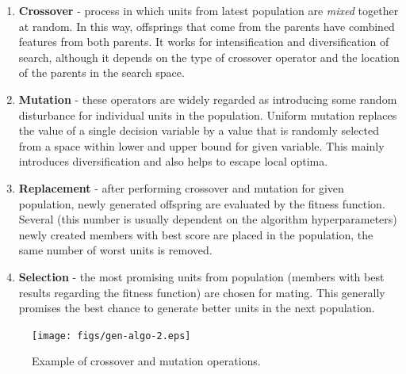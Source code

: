\documentclass[12pt,a4paper,openany]{book}
\begin{document}




\begin{enumerate}
\item \textbf{Crossover} - process in which units from latest population are \textit{mixed} together at random. In this way, offsprings that come from the parents have combined features from both parents. It works for intensification and diversification of search, although it depends on the type of crossover operator and the location of the parents in the search space.
\item \textbf{Mutation} - these operators are widely regarded as introducing some random disturbance for individual units in the population. Uniform mutation replaces the value of a single decision variable by a value that is randomly selected from a space within lower and upper bound for given variable. This mainly introduces diversification and also helps to escape local optima.
\item \textbf{Replacement} - after performing crossover and mutation for given population, newly generated offspring are evaluated by the fitness function. Several (this number is usually dependent on the algorithm hyperparameters) newly created members with best score are placed in the population, the same number of worst units is removed.
\item \textbf{Selection} - the most promising units from population (members with best results regarding the fitness function) are chosen for mating. This generally promises the best chance to generate better units in the next population.
\end{enumerate}


 \begin{figure}[ht!]
     \centering
     \texttt{[image: figs/gen-algo-2.eps]}
     \caption{Example of crossover and mutation operations.}\label{Fig:PROGAN}
 \end{figure}
 
\end{document}
